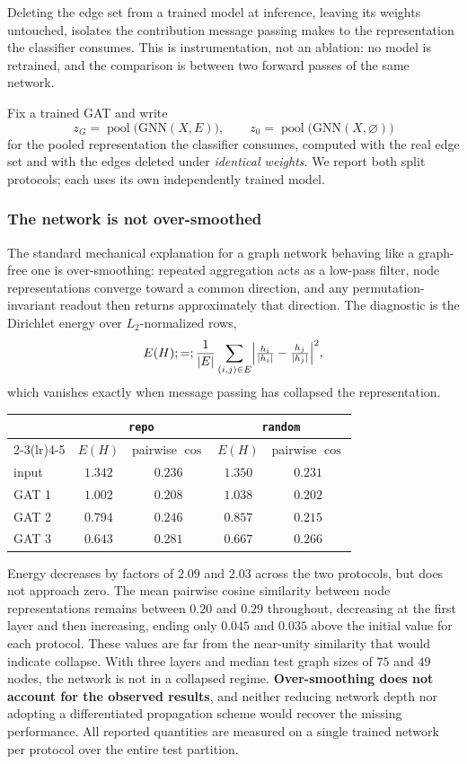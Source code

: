 Deleting the edge set from a trained model at inference, leaving its weights
untouched, isolates the contribution message passing makes to the representation
the classifier consumes. This is instrumentation, not an ablation: no model is
retrained, and the comparison is between two forward passes of the same
network.

Fix a trained GAT and write
\[
  z_G = \operatorname{pool}\bigl(\mathrm{GNN}(X, E)\bigr), \qquad
  z_0 = \operatorname{pool}\bigl(\mathrm{GNN}(X, \varnothing)\bigr)
\]
for the pooled representation the classifier consumes, computed with the real edge set and with the edges deleted under \emph{identical weights}. We report both split protocols; each uses its own independently trained model.

\subsubsection{The network is not over-smoothed}
The standard mechanical explanation for a graph network behaving like a graph-free one is over-smoothing: repeated aggregation acts as a low-pass filter, node representations converge toward a common direction, and any permutation-invariant readout then returns approximately that direction. The diagnostic is the Dirichlet energy over $ L_2$-normalized rows,
\[
E(H) ;=; \frac{1}{|E|}\sum_{(i,j) \in E}
\Bigl| \tfrac{h_i}{|h_i|} - \tfrac{h_j}{|h_j|} \Bigr|^2 ,
\]
which vanishes exactly when message passing has collapsed the representation.

\begin{center}
\begin{tabular}{lcccc}
\toprule
& \multicolumn{2}{c}{\texttt{repo}} & \multicolumn{2}{c}{\texttt{random}} \\
\cmidrule(lr){2-3}\cmidrule(lr){4-5}
& $E(H)$ & pairwise $\cos$ & $E(H)$ & pairwise $\cos$ \\
\midrule
input & $1.342$ & $0.236$ & $1.350$ & $0.231$ \\
GAT 1 & $1.002$ & $0.208$ & $1.038$ & $0.202$ \\
GAT 2 & $0.794$ & $0.246$ & $0.857$ & $0.215$ \\
GAT 3 & $0.643$ & $0.281$ & $0.667$ & $0.266$ \\
\bottomrule
\end{tabular}
\end{center}

Energy decreases by factors of $2.09$ and $2.03$ across the two protocols, but does not approach zero. The mean pairwise cosine similarity between node representations remains between $0.20$ and $0.29$ throughout, decreasing at the first layer and then increasing, ending only $0.045$ and $0.035$ above the initial value for each protocol. These values are far from the near-unity similarity that would indicate collapse. With three layers and median test graph sizes of $75$ and $49$ nodes, the network is not in a collapsed regime. \textbf{Over-smoothing does not account for the observed results}, and neither reducing network depth nor adopting a differentiated propagation scheme would recover the missing performance. All reported quantities are measured on a single trained network per protocol over the entire test partition.


